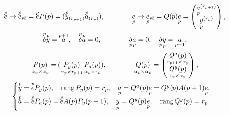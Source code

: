 \begin{gather} 


\up{p}{e}\to\up{p}{e}_{st}=\up{p}{e}P(p)= 


(\up{p}{y}_{(r_{p+1})}\up{p}{a}_{(r_p)}),\qquad\qquad 


\down{p}{e}\to\down{p}{e}{}_{st}=Q(p)\down{p}{e} =


\begin{pmatrix} 


\down{p}{a}^{(r_{p+1})} \\ \down{p}{y}^{(r_p)}


\end{pmatrix} 


, \notag \\ 


\up{p}{\delta}\up{p}{y}=\up{p+1}{a},\quad 


\up{p}{\delta}\up{p}{a}=0,\qquad\qquad 


\down{p}{\delta}\down{p}{a}=0,\quad 


\down{p}{\delta}\down{p}{y}=\down{p-1}{a},\notag \\ 


%


\down{\alpha_p\times\alpha_p}{P(p)}= 


(\down{\alpha_p\times r_{p+1}}{P_y(p)}\, 


\down{\alpha_p\times r_p}{P_a(p)}),\qquad\qquad 


\down{\alpha_p\times\alpha_p}{Q(p)}= 


\begin{pmatrix} 


\down{r_{p+1}\times\alpha_p}{Q^a(p)} \\ 


\down{r_p\times\alpha_p}{Q^y(p)} 


\end{pmatrix} 


, \\ 


\begin{cases} 


\up{p}{y}=\up{p}{e}P_y(p),\quad\rang P_y(p)=r_p,\quad 


\down{p}{a}=Q^a(p)\down{p}{e}=Q^y(p)A(p+1)\down{p}{e}, \\ 


\up{p}{a}=\up{p}{e}P_a(p)=\up{p}{e}A(p)P_y(p-1),\quad 


\down{p}{y}=Q^y(p)\down{p}{e},\quad  


\rang Q^y(p)=r_p 


\end{cases} 


\end{gather} 


